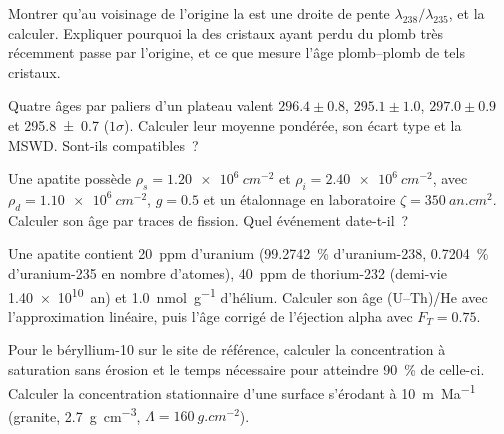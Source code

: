 \begin{exercise}[$\star\star$]\label{exo:b3:advanced-geochronology:5}
Montrer qu'au voisinage de l'origine la  est une droite de pente
$\lambda_{238}/\lambda_{235}$, et la calculer. Expliquer pourquoi la  des
cristaux ayant perdu du plomb très récemment passe par l'origine, et
ce que mesure l'âge plomb--plomb de tels cristaux.
\end{exercise}

\begin{exercise}[$\star\star$]\label{exo:b3:advanced-geochronology:6}
Quatre âges par paliers d'un plateau valent $296.4 \pm 0.8$, $295.1 \pm 1.0$, $297.0 \pm
0.9$ et \qty[separate-uncertainty=true]{295.8 \pm 0.7}{\Ma} ($1\sigma$). Calculer leur moyenne pondérée,
son écart type et la MSWD. Sont-ils compatibles~?
\end{exercise}

\begin{exercise}[$\star\star$]\label{exo:b3:advanced-geochronology:7}
Une apatite possède $\rho_s = \qty{1.20e6}{cm^{-2}}$ et $\rho_i =
\qty{2.40e6}{cm^{-2}}$, avec $\rho_d = \qty{1.10e6}{cm^{-2}}$, $g = 0.5$ et un
étalonnage en laboratoire $\zeta = \qty{350}{an.cm^2}$. Calculer son âge par traces
de fission. Quel événement date-t-il~?
\end{exercise}

\begin{exercise}[$\star\star$]\label{exo:b3:advanced-geochronology:8}
Une apatite contient \qty{20}{ppm} d'uranium (\qty{99.2742}{\percent}
d'uranium-238, \qty{0.7204}{\percent} d'uranium-235 en nombre d'atomes), \qty{40}{ppm}
de thorium-232 (demi-vie \qty{1.40e10}{an}) et \qty{1.0}{nmol.g^{-1}} d'hélium.
Calculer son âge (U--Th)/He avec l'approximation linéaire, puis l'âge
corrigé de l'éjection alpha avec $F_T = 0.75$.
\end{exercise}

\begin{exercise}[$\star\star$]\label{exo:b3:advanced-geochronology:9}
Pour le béryllium-10 sur le site de référence, calculer la concentration à saturation
sans érosion et le temps nécessaire pour atteindre \qty{90}{\percent} de celle-ci. Calculer la
concentration stationnaire d'une surface s'érodant à \qty{10}{m.Ma^{-1}} (granite,
\qty{2.7}{g.cm^{-3}}, $\Lambda = \qty{160}{g.cm^{-2}}$).
\end{exercise}

